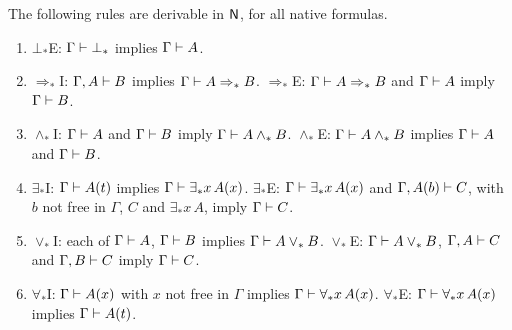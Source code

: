 \begin{theorem}
\label{base:thm:logic}
The following rules are derivable in $\mathsf{N}$, for all native formulas.
\begin{enumerate}[label=\textup{(\roman*)}]
\item $\bot_*$E: $\Gamma\vdash\bot_*$ implies $\Gamma\vdash A$.
\item $\Rightarrow_*$I: $\Gamma,A\vdash B$ implies
 $\Gamma\vdash A\Rightarrow_* B$.\quad
 $\Rightarrow_*$E: $\Gamma\vdash A\Rightarrow_* B$ and $\Gamma\vdash A$
 imply $\Gamma\vdash B$.
\item $\wedge_*$I: $\Gamma\vdash A$ and $\Gamma\vdash B$ imply
 $\Gamma\vdash A\wedge_* B$.\quad
 $\wedge_*$E: $\Gamma\vdash A\wedge_* B$ implies $\Gamma\vdash A$ and
 $\Gamma\vdash B$.
\item $\exists_*$I: $\Gamma\vdash A(t)$ implies
 $\Gamma\vdash\exists_* x\,A(x)$.\quad
 $\exists_*$E: $\Gamma\vdash\exists_* x\,A(x)$ and $\Gamma,A(b)\vdash C$,
 with $b$ not free in $\Gamma$, $C$ and $\exists_* x\,A$, imply
 $\Gamma\vdash C$.
\item $\vee_*$I: each of $\Gamma\vdash A$, $\Gamma\vdash B$ implies
 $\Gamma\vdash A\vee_* B$.\quad
 $\vee_*$E: $\Gamma\vdash A\vee_* B$, $\Gamma,A\vdash C$ and
 $\Gamma,B\vdash C$ imply $\Gamma\vdash C$.
\item $\forall_*$I: $\Gamma\vdash A(x)$ with $x$ not free in $\Gamma$
 implies $\Gamma\vdash\forall_* x\,A(x)$.\quad
 $\forall_*$E: $\Gamma\vdash\forall_* x\,A(x)$ implies
 $\Gamma\vdash A(t)$.
\end{enumerate}
\end{theorem}

